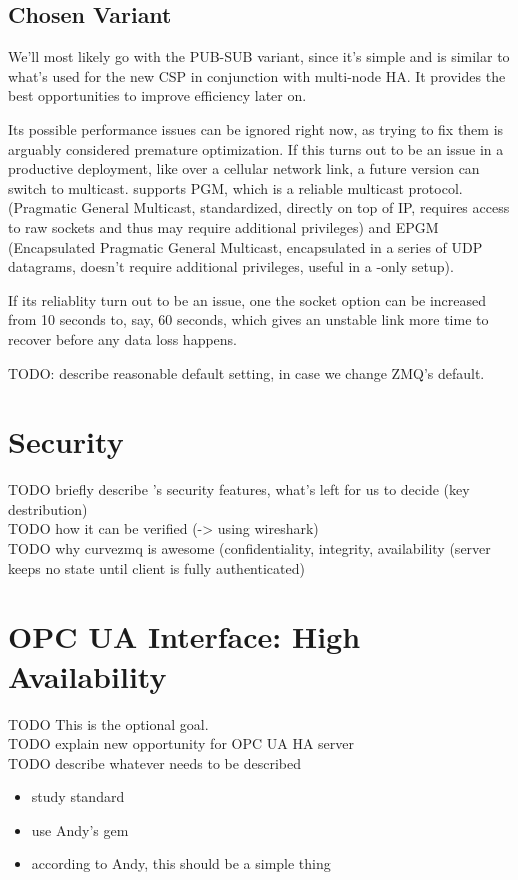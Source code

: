 \subsection{Chosen Variant}
We'll most likely go with the PUB-SUB variant, since it's simple and is similar to
what's used for the new CSP in conjunction with multi-node HA. It provides the best
opportunities to improve efficiency later on.

Its possible performance issues can be ignored right now, as trying to fix them
is arguably considered premature optimization. If this turns out to be an issue
in a productive deployment, like over a cellular network link, a future version
can switch to multicast. \zmq supports PGM, which is a reliable multicast
protocol. (Pragmatic General Multicast, standardized, directly on top of IP,
requires access to raw sockets and thus may require additional privileges) and
EPGM (Encapsulated Pragmatic General Multicast, encapsulated in a series of UDP
datagrams, doesn't require additional privileges, useful in a \zmq-only setup).

If its reliablity turn out to be an issue, one the socket option
 can be increased from 10 seconds to, say, 60 seconds, which
gives an unstable link more time to recover before any data loss happens.

TODO: describe reasonable default setting, in case we change ZMQ's default.


\section{Security}\label{sec:meth:security}
TODO briefly describe \zmq's security features, what's left for us to decide (key destribution)\\
TODO how it can be verified (-> using wireshark)\\
TODO why curvezmq is awesome (confidentiality, integrity, availability (server keeps no state until client is fully authenticated)




\section{OPC UA Interface: High Availability}\label{sec:meth:opc-ua}
TODO This is the optional goal.\\
TODO explain new opportunity for OPC UA HA server\\
TODO describe whatever needs to be described\\

\begin{itemize}
	\item study standard
	\item use Andy's gem
	\item according to Andy, this should be a simple thing
\end{itemize}
